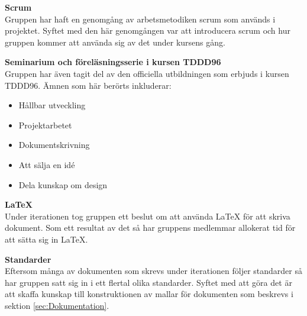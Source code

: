 \documentclass[a4paper,10pt]{article}
\begin{document}
\textbf{Scrum}\\ Gruppen har haft en genomgång av arbetsmetodiken scrum som används i projektet. Syftet med den här genomgången var att introducera scrum och hur gruppen kommer att använda sig av det under kursens gång.

\textbf{Seminarium och föreläsningsserie i kursen TDDD96}\\ Gruppen har även tagit del av den officiella utbildningen som erbjuds i kursen TDDD96. Ämnen som här berörts inkluderar:
\begin{itemize}
    \item Hållbar utveckling
    \item Projektarbetet
    \item Dokumentskrivning
    \item Att sälja en idé
    \item Dela kunskap om design
\end{itemize}

\textbf{\LaTeX}\\ Under iterationen tog gruppen ett beslut om att använda LaTeX för att skriva dokument. Som ett resultat av det så har gruppens medlemmar allokerat tid för att sätta sig in LaTeX.

\textbf{Standarder}\\ Eftersom många av dokumenten som skrevs under iterationen följer standarder så har gruppen satt sig in i ett flertal olika standarder. Syftet med att göra det är att skaffa kunskap till konstruktionen av mallar för dokumenten som beskrevs i sektion \ref{sec:Dokumentation}.
\end{document}
